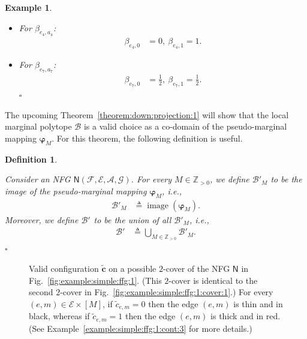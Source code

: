 \documentclass[journal, twocolumn]{IEEEtran}
\renewcommand{\mathbf}[1]{{\bm{#1}}}
\newcommand{\ie}{\emph{i.e.}}
\newcommand{\Z}{\mathbb{Z}}
\newcommand{\Zpp}{\Z_{>0}}
\newcommand{\vect}[1]{\mathbf{#1}}
\newcommand{\set}[1]{\mathcal{#1}}
\newcommand{\graph}[1]{\mathsf{#1}}
\newcommand{\defeq}{\triangleq}
\newcommand{\setA}{\set{A}}
\newcommand{\setE}{\set{E}}
\newcommand{\setF}{\set{F}}
\newcommand{\setG}{\set{G}}
\newcommand{\lmpB}{\mathcal{B}}
\newcommand{\lmpBdown}[1]{\mathcal{B}'_{#1}}
\newcommand{\graphN}{\graph{N}}
\newcommand{\cover}[1]{\tilde{#1}}
\newcommand{\?}{\mathrm{?}}
\newcommand{\varphiM}{\boldsymbol{\varphi}_{M}}
\newcommand{\tvc}{\vect{\tilde{c}}}
\newcommand{\qedwhite}{\hspace*{\fill}%
  $\square$\smallskip}
\newcommand{\defend}{\qedwhite}
\newcommand{\exampleend}{\qedwhite}
\newtheorem{Definition}[Lemma]{Definition}
\newtheorem{Example}[Lemma]{Example}
\begin{document}
\begin{Example}
\begin{itemize}
  \item For $\beta_{e_4,a_4}$:
    \begin{align*}
      \beta_{e_4,0}
        &= 0, \  
      \beta_{e_4,1}
         = 1.
    \end{align*}

  \item For $\beta_{e_7,a_7}$:
    \begin{align*}
      \beta_{e_7,0}
        &= \frac{1}{2}, \ 
      \beta_{e_7,1}
         = \frac{1}{2}.
    \end{align*}
  \exampleend

  \end{itemize}

\end{Example}





The upcoming Theorem~\ref{theorem:down:projection:1} will show that the local
marginal polytope $\lmpB$ is a valid choice as a co-domain of the
pseudo-marginal mapping $\varphiM$. For this theorem, the following definition
is useful.


\begin{Definition}
  \label{def:down:projection:2}

  Consider an NFG $\graphN(\setF,\setE, \setA, \setG)$. For every $M \in
  \Zpp$, we define $\lmpBdown{M}$ to be the image of the pseudo-marginal
  mapping $\varphiM$, \ie,
  \begin{align*}
    \lmpBdown{M}
      &\defeq
         \operatorname{image}(\varphiM).
  \end{align*}
  Moreover, we define $\lmpBdown{}$ to be the union of all $\lmpBdown{M}$, \ie,
  \begin{align}
    \lmpBdown{}
      &\defeq
         \bigcup_{M \in \Zpp}
           \lmpBdown{M}. 
             \label{eq:def:lmp:B:prime:1}
  \end{align}
  \vskip-0.5cm
  \defend
\end{Definition}


\begin{figure}
  \begin{center}
  \end{center}
  \caption{Valid configuration $\tvc$ on a possible $2$-cover of the NFG
    $\graphN$ in Fig.~\ref{fig:example:simple:ffg:1}. (This $2$-cover is
    identical to the second $2$-cover in
    Fig.~\ref{fig:example:simple:ffg:1:cover:1}.) For every $(e,m) \in \setE
    \times [M]$, if $\cover{c}_{e,m} = 0$ then the edge $(e,m)$ is thin and in
    black, whereas if $\cover{c}_{e,m} = 1$ then the edge $(e,m)$ is thick and
    in red. (See Example~\ref{example:simple:ffg:1:cont:3} for more details.)}
  \label{fig:example:simple:ffg:1:cover:1:configuration:1}
\end{figure}
\end{document}

